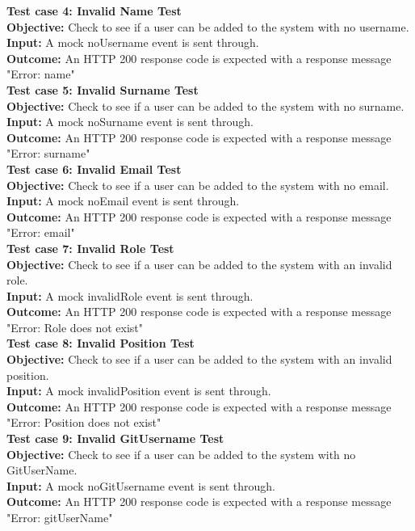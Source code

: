 \documentclass[11pt,a4paper]{article}
\begin{document}
\textbf{Test case 4: Invalid Name Test} \\
\textbf{Objective: } Check to see if a user can be added to the system with no username. \\
\textbf{Input: }  A mock noUsername event is sent through.\\
\textbf{Outcome: } An HTTP 200 response code is expected with a response message "Error: name" \\

\textbf{Test case 5: Invalid Surname Test} \\
\textbf{Objective: } Check to see if a user can be added to the system with no surname. \\
\textbf{Input: }  A mock noSurname event is sent through.\\
\textbf{Outcome: } An HTTP 200 response code is expected with a response message "Error: surname" \\

\textbf{Test case 6: Invalid Email Test} \\
\textbf{Objective: } Check to see if a user can be added to the system with no email. \\
\textbf{Input: }  A mock noEmail event is sent through.\\
\textbf{Outcome: } An HTTP 200 response code is expected with a response message "Error: email" \\

\textbf{Test case 7: Invalid Role Test} \\
\textbf{Objective: } Check to see if a user can be added to the system with an invalid role. \\
\textbf{Input: }  A mock invalidRole event is sent through.\\
\textbf{Outcome: } An HTTP 200 response code is expected with a response message "Error: Role does not exist" \\


\textbf{Test case 8: Invalid Position Test} \\
\textbf{Objective: } Check to see if a user can be added to the system with an invalid position. \\
\textbf{Input: }  A mock invalidPosition event is sent through.\\
\textbf{Outcome: } An HTTP 200 response code is expected with a response message "Error: Position does not exist" \\


\textbf{Test case 9: Invalid GitUsername Test} \\
\textbf{Objective: } Check to see if a user can be added to the system with no GitUserName. \\
\textbf{Input: }  A mock noGitUsername event is sent through.\\
\textbf{Outcome: } An HTTP 200 response code is expected with a response message "Error: gitUserName" \\
\end{document}
